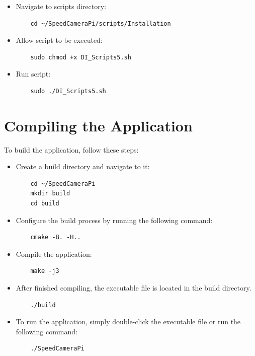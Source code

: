 \begin{itemize}
      \item Navigate to scripts directory:

            \begin{lstlisting}
    cd ~/SpeedCameraPi/scripts/Installation
    \end{lstlisting}

      \item Allow script to be executed:

            \begin{lstlisting}
    sudo chmod +x DI_Scripts5.sh
    \end{lstlisting}

      \item Run script:

            \begin{lstlisting}
    sudo ./DI_Scripts5.sh
    \end{lstlisting}
\end{itemize}

\chapter{Compiling the Application}
\label{chap:compiling-the-application}

To build the application, follow these steps:

\begin{itemize}
      \item Create a build directory and navigate to it:

            \begin{lstlisting}
    cd ~/SpeedCameraPi
    mkdir build
    cd build
    \end{lstlisting}

      \item Configure the build process by running the following command:

            \begin{lstlisting}
    cmake -B. -H..
    \end{lstlisting}

      \item Compile the application:

            \begin{lstlisting}
    make -j3
    \end{lstlisting}

      \item After finished compiling, the executable file is located in the build directory.

            \begin{lstlisting}
    ./build
    \end{lstlisting}

      \item To run the application, simply double-click the executable file or run the following command:

            \begin{lstlisting}
    ./SpeedCameraPi
    \end{lstlisting}
\end{itemize}

